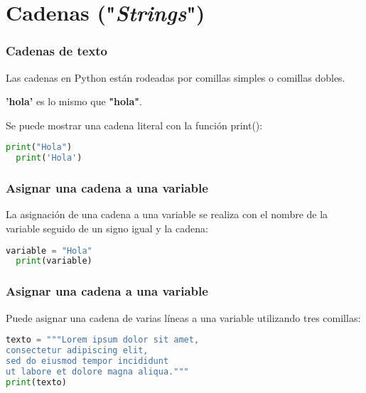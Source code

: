 
\section{Cadenas ("\emph{Strings}")}

\begin{frame}[fragile]
  \frametitle{Cadenas de texto}

  Las cadenas en Python están rodeadas por comillas simples o comillas dobles.

  \vspace{\baselineskip}
  \textbf{'hola'} es lo mismo que \textbf{"hola"}.

  \vspace{\baselineskip}
  Se puede mostrar una cadena literal con la función
  \textcolor{codeKeyword}{print}():

  \vspace{\baselineskip}
  \begin{lstlisting}[language=Python]
  print("Hola")
  print('Hola')
  \end{lstlisting}
\end{frame}

\begin{frame}[fragile]
  \frametitle{Asignar una cadena a una variable}

  La asignación de una cadena a una variable se realiza con el nombre de
  la variable seguido de un signo igual y la cadena:

  \vspace{\baselineskip}
  \begin{lstlisting}[language=Python]
  variable = "Hola"
  print(variable)
  \end{lstlisting}
\end{frame}

\begin{frame}[fragile]
  \frametitle{Asignar una cadena a una variable}

  Puede asignar una cadena de varias líneas a una variable
  utilizando tres comillas:

  \begin{lstlisting}[language=Python]
texto = """Lorem ipsum dolor sit amet,
consectetur adipiscing elit,
sed do eiusmod tempor incididunt
ut labore et dolore magna aliqua."""
print(texto)
  \end{lstlisting}
\end{frame}

